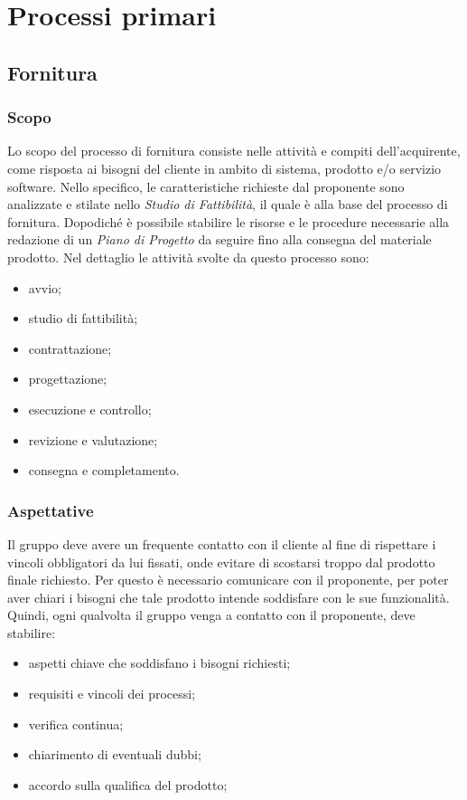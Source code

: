 \section{Processi primari}
	\subsection{Fornitura}
		\subsubsection{Scopo}
		Lo scopo del processo di fornitura consiste nelle attività e compiti dell'acquirente, come risposta ai bisogni del cliente in ambito di sistema, prodotto e/o servizio software. Nello specifico, le caratteristiche richieste dal proponente sono analizzate e stilate nello \textit{Studio di Fattibilità}, il quale è alla base del processo di fornitura. Dopodiché è possibile stabilire le risorse e le procedure necessarie alla redazione di un \textit{Piano di Progetto} da seguire fino alla consegna del materiale prodotto.
		Nel dettaglio le attività svolte da questo processo sono:
		\begin{itemize}
			\item[] avvio;
			\item[] studio di fattibilità;
			\item[] contrattazione;
			\item[] progettazione;
			\item[] esecuzione e controllo;
			\item[] revizione e valutazione;
			\item[] consegna e completamento.
		\end{itemize}
		\subsubsection{Aspettative}
		Il gruppo deve avere un frequente contatto con il cliente al fine di rispettare i vincoli obbligatori da lui fissati, onde evitare di scostarsi troppo dal prodotto finale richiesto. Per questo è necessario comunicare con il proponente, per poter aver chiari i bisogni che tale prodotto intende soddisfare con le sue funzionalità.
		Quindi, ogni qualvolta il gruppo venga a contatto con il proponente, deve stabilire:
		\begin{itemize}
			\item[] aspetti chiave che soddisfano i bisogni richiesti;
			\item[] requisiti e vincoli dei processi;
			\item[] verifica continua;
			\item[] chiarimento di eventuali dubbi;
			\item[] accordo sulla qualifica del prodotto;
			\end{itemize} 
